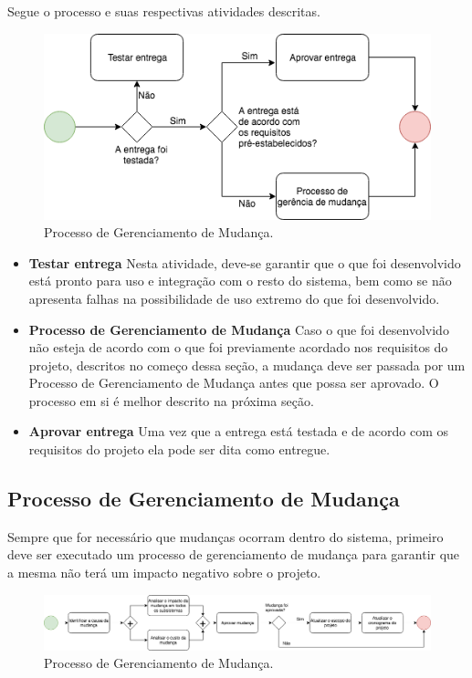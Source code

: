     Segue o processo e suas respectivas atividades descritas.

\begin{figure}[!ht]
	\centering
		\includegraphics[scale=0.7]{figuras/entrega}
	\caption{Processo de Gerenciamento de Mudança.}
\end{figure}

\begin{itemize}
    \item \textbf{Testar entrega}
        Nesta atividade, deve-se garantir que o que foi desenvolvido está pronto para uso e integração com o resto do sistema, bem como se não apresenta falhas na possibilidade de uso extremo do que foi desenvolvido.

    \item \textbf{Processo de Gerenciamento de Mudança}
        Caso o que foi desenvolvido não esteja de acordo com o que foi previamente acordado nos requisitos do projeto, descritos no começo dessa seção, a mudança deve ser passada por um Processo de Gerenciamento de Mudança antes que possa ser aprovado. O processo em si é melhor descrito na próxima seção.

    \item \textbf{Aprovar entrega}
        Uma vez que a entrega está testada e de acordo com os requisitos do projeto ela pode ser dita como entregue.
\end{itemize}

\subsection{Processo de Gerenciamento de Mudança}
    Sempre que for necessário que mudanças ocorram dentro do sistema, primeiro deve ser executado um processo de gerenciamento de mudança para garantir que a mesma não terá um impacto negativo sobre o projeto.

\begin{figure}[!ht]
	\centering
		\includegraphics[scale=0.4]{figuras/mudanca}
	\caption{Processo de Gerenciamento de Mudança.}
\end{figure}

